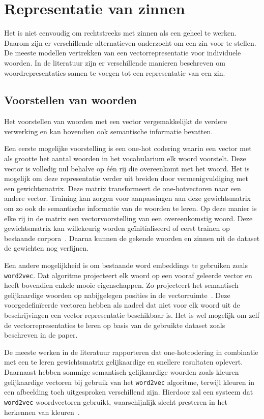 \section{Representatie van zinnen}
Het is niet eenvoudig om rechtstreeks met zinnen als een geheel te werken. Daarom zijn er verschillende alternatieven onderzocht om een zin voor te stellen.
De meeste modellen vertrekken van een vectorrepresentatie voor individuele woorden. In de literatuur zijn er verschillende manieren beschreven om woordrepresentaties samen te voegen tot een representatie van een zin.

\subsection{Voorstellen van woorden}
 Het voorstellen van woorden met een vector vergemakkelijkt de verdere verwerking en kan bovendien ook semantische informatie bevatten.

 Een eerste mogelijke voorstelling is een one-hot codering waarin een vector met als grootte het aantal woorden in het vocabularium elk woord voorstelt. Deze vector is volledig nul behalve op \'e\'en rij die overeenkomt met het woord. Het is mogelijk om deze representatie verder uit breiden door vermenigvuldiging met een gewichtsmatrix. Deze matrix transformeert de one-hotvectoren naar een andere vector. Training kan zorgen voor aanpassingen aan deze gewichtsmatrix om zo ook de semantische informatie van de woorden te leren. Op deze manier is elke rij in de matrix een vectorvoorstelling van een overeenkomstig woord. Deze gewichtsmatrix kan willekeurig worden ge\"initialiseerd of eerst trainen op bestaande corpora~\cite{Lebret2013,Mao2014a,Google}. Daarna kunnen de gekende woorden en zinnen uit de dataset de gewichten nog verfijnen.  

 Een andere mogelijkheid is om bestaande word embeddings te gebruiken zoals \texttt{word2vec}. Dat algoritme projecteert elk woord op een vooraf geleerde vector en heeft bovendien enkele mooie eigenschappen. Zo projecteert het semantisch gelijkaardige woorden op nabijgelegen posities in de vectorruimte~\cite{Mikolov2013}. Deze voorgedefin\"ieerde vectoren hebben als nadeel dat niet voor elk woord uit de beschrijvingen een vector representatie beschikbaar is. Het is wel mogelijk om zelf de vectorrepresentaties te leren op basis van de gebruikte dataset zoals beschreven in de paper.

 De meeste werken in de literatuur rapporteren dat one-hotcodering in combinatie met een te leren gewichtsmatrix gelijkaardige en snellere resultaten oplevert. Daarnaast hebben sommige semantisch gelijkaardige woorden zoals kleuren gelijkaardige vectoren bij gebruik van het \texttt{word2vec} algoritme, terwijl kleuren in een afbeelding toch uitgesproken verschillend zijn. Hierdoor zal een systeem dat \texttt{word2vec} woordvectoren gebruikt, waarschijnlijk slecht presteren in het herkennen van kleuren~\cite{Karpathy2015}.
 
